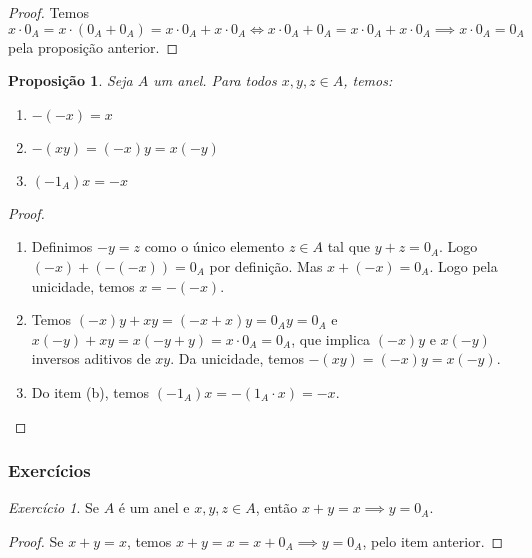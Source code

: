 \documentclass{article}
\theoremstyle{plain}
\newtheorem{prop}{Proposição}[section]
\theoremstyle{definition}
\theoremstyle{remark}
\newtheorem{exercicio}{Exercício}[subsection]
\begin{document}
\begin{proof}
	Temos $x\cdot 0_A = x\cdot (0_A + 0_A) = x\cdot 0_A +x\cdot 0_A \iff x\cdot 0_A + 0_A = x\cdot 0_A + x\cdot 0_A \implies x\cdot 0_A = 0_A $ pela proposição anterior.
\end{proof}
\begin{prop}
	Seja $A$  um anel. Para todos $x,y,z \in A$, temos:
	\begin{enumerate}[label=(\alph*)]
		\item $-(-x) = x$
		\item $-(xy) = (-x)y = x(-y)$
		\item $(-1_A)x = -x$
	\end{enumerate}
\end{prop}
\begin{proof}
	~\\
	
	\begin{enumerate}[label=(\alph*)]
		\item Definimos $-y = z$ como o único elemento $z\in A$ tal que $y + z = 0_A $.   Logo $(-x) +(-(-x)) =   0_A$ por definição. Mas $x + (-x) = 0_A$. Logo pela unicidade, temos $x =-(-x)$.
		\item Temos  $(-x)y +xy = (-x+x)y = 0_A y = 0_A$ e $x(-y) +xy = x(-y+y) = x\cdot 0_A = 0_A$, que implica $(-x)y$ e $x(-y)$ inversos aditivos de $xy$. Da unicidade, temos $-(xy) = (-x)y = x(-y)$.
		\item Do item (b), temos $(-1_A)x = -(1_A\cdot x) = -x$.
	\end{enumerate}
\end{proof}
\subsubsection{Exercícios}
\begin{exercicio}
	Se $A$ é um anel e $x,y,z\in A$, então $x+y = x \implies y = 0_A$.
\end{exercicio}
\begin{proof}
		Se $x+y = x$, temos $x+y = x = x+0_A \implies y = 0_A$, pelo item anterior.
\end{proof}
\end{document}
